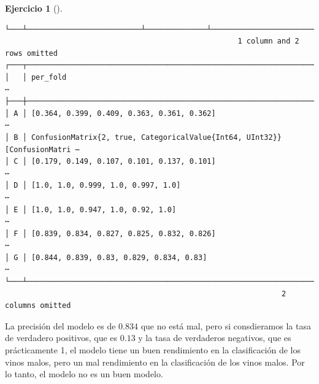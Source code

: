 \documentclass[
  a4paper,
]{scrreport}
\theoremstyle{definition}
\newtheorem{exercise}{Ejercicio}[chapter]
\theoremstyle{remark}
\begin{document}
\begin{exercise}[]
\begin{enumerate}
\begin{tcolorbox}
\begin{verbatim}
└───┴──────────────────────────┴──────────────┴─────────────────────────────────
                                                     1 column and 2 rows omitted
┌───┬───────────────────────────────────────────────────────────────────────────
│   │ per_fold                                                                 ⋯
├───┼───────────────────────────────────────────────────────────────────────────
│ A │ [0.364, 0.399, 0.409, 0.363, 0.361, 0.362]                               ⋯
│ B │ ConfusionMatrix{2, true, CategoricalValue{Int64, UInt32}}[ConfusionMatri ⋯
│ C │ [0.179, 0.149, 0.107, 0.101, 0.137, 0.101]                               ⋯
│ D │ [1.0, 1.0, 0.999, 1.0, 0.997, 1.0]                                       ⋯
│ E │ [1.0, 1.0, 0.947, 1.0, 0.92, 1.0]                                        ⋯
│ F │ [0.839, 0.834, 0.827, 0.825, 0.832, 0.826]                               ⋯
│ G │ [0.844, 0.839, 0.83, 0.829, 0.834, 0.83]                                 ⋯
└───┴───────────────────────────────────────────────────────────────────────────
                                                               2 columns omitted
\end{verbatim}

  La precisión del modelo es de \(0.834\) que no está mal, pero si
  consdieramos la tasa de verdadero positivos, que es \(0.13\) y la tasa
  de verdaderos negativos, que es prácticamente 1, el modelo tiene un
  buen rendimiento en la clasificación de los vinos malos, pero un mal
  rendimiento en la clasificación de los vinos malos. Por lo tanto, el
  modelo no es un buen modelo.

  \end{tcolorbox}
\end{enumerate}

\end{exercise}
\end{document}
